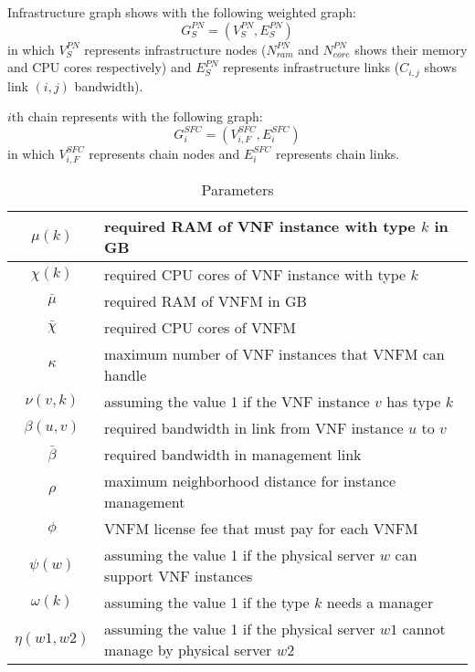 \par
Infrastructure graph shows with the following weighted graph:
\[
G_S^{PN} = (V_S^{PN}, E_S^{PN})
\]
in which
\(V_S^{PN}\) represents infrastructure nodes (\(N_{ram}^{PN}\) and \(N_{core}^{PN}\) shows their memory and CPU cores respectively) and
\(E_S^{PN}\) represents infrastructure links (\(C_{i,j}\) shows link \((i, j)\) bandwidth).

\par
\(i\)th chain represents with the following graph:
\[
G^{SFC}_i = (V^{SFC}_{i, F}, E^{SFC}_i)
\]
in which
\(V^{SFC}_{i, F}\) represents chain nodes and
\(E^{SFC}_{i}\) represents chain links.

\begin{table}[H]
    \caption{Parameters}
    \label{tbl:parameters}
    \begin{center}\begin{tabular}{|c|p{}|}
    \hline
    \(\mu(k)\) & required RAM of VNF instance with type \(k\) in GB \\
    \hline
    \(\chi(k)\) & required CPU cores of VNF instance with type \(k\) \\
    \hline
    \(\bar\mu\) & required RAM of VNFM in GB \\
    \hline
    \(\bar\chi\) & required CPU cores of VNFM \\
    \hline
    \(\kappa\) & maximum number of VNF instances that VNFM can handle \\
    \hline
    \(\nu(v, k)\) & assuming the value 1 if the VNF instance \(v\) has type \(k\)  \\
    \hline
    \(\beta(u, v)\) & required bandwidth in link from VNF instance \(u\) to \(v\) \\
    \hline
    \(\bar{\beta}\) & required bandwidth in management link \\
    \hline
    \(\rho\) & maximum neighborhood distance for instance management \\
    \hline
    \(\phi\) & VNFM license fee that must pay for each VNFM \\
    \hline
    \(\psi(w)\) & assuming the value 1 if the physical server \(w\) can support VNF instances \\
    \hline
    \(\omega(k)\) & assuming the value 1 if the type \(k\) needs a manager \\
    \hline
    \(\eta(w1, w2)\) & assuming the value 1 if the physical server \(w1\) cannot manage by physical server \(w2\) \\
    \hline
    \end{tabular}\end{center}
\end{table}

